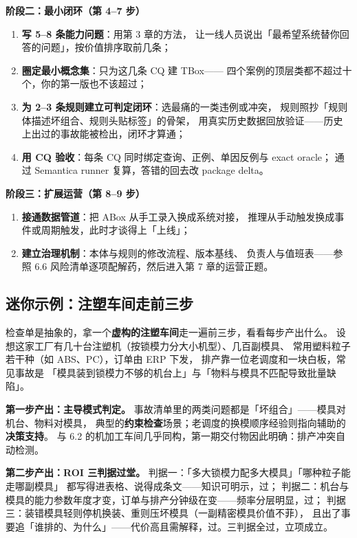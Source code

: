 \textbf{阶段二：最小闭环（第 4--7 步）}
\begin{enumerate}
\item \textbf{写 5--8 条能力问题}：用第 3 章的方法，
  让一线人员说出「最希望系统替你回答的问题」，按价值排序取前几条；
\item \textbf{圈定最小概念集}：只为这几条 CQ 建 TBox——
  四个案例的顶层类都不超过十个，你的第一版也不该超过；
\item \textbf{为 2--3 条规则建立可判定闭环}：选最痛的一类违例或冲突，
  规则照抄「规则体描述坏组合、规则头贴标签」的骨架，
  用真实历史数据回放验证——历史上出过的事故能被检出，闭环才算通；
\item \textbf{用 CQ 验收}：每条 CQ 同时绑定查询、正例、单因反例与 exact oracle；
  通过 Semantica runner 复算，答错的回去改 package delta。
\end{enumerate}

\textbf{阶段三：扩展运营（第 8--9 步）}
\begin{enumerate}
\item \textbf{接通数据管道}：把 ABox 从手工录入换成系统对接，
  推理从手动触发换成事件或周期触发，此时才谈得上「上线」；
\item \textbf{建立治理机制}：本体与规则的修改流程、版本基线、
  负责人与值班表——参照 6.6 风险清单逐项配解药，然后进入第 7 章的运营正题。
\end{enumerate}

\subsection{迷你示例：注塑车间走前三步}

检查单是抽象的，拿一个\textbf{虚构的注塑车间}走一遍前三步，看看每步产出什么。
设想这家工厂有几十台注塑机（按锁模力分大小机型）、几百副模具、
常用塑料粒子若干种（如 ABS、PC），订单由 ERP 下发，
排产靠一位老调度和一块白板，常见事故是
「模具装到锁模力不够的机台上」与「物料与模具不匹配导致批量缺陷」。

\textbf{第一步产出：主导模式判定。}
事故清单里的两类问题都是「坏组合」——模具对机台、物料对模具，
典型的\textbf{约束检查}场景；老调度的换模顺序经验则指向辅助的\textbf{决策支持}。
与 6.2 的机加工车间几乎同构，第一期交付物因此明确：排产冲突自动检测。

\textbf{第二步产出：ROI 三判据过堂。}
判据一：「多大锁模力配多大模具」「哪种粒子能走哪副模具」
都写得进表格、说得成条文——知识可明示，过；
判据二：机台与模具的能力参数年度才变，订单与排产分钟级在变——频率分层明显，过；
判据三：装错模具轻则停机换装、重则压坏模具（一副精密模具价值不菲），
且出了事要追「谁排的、为什么」——代价高且需解释，过。三判据全过，立项成立。

